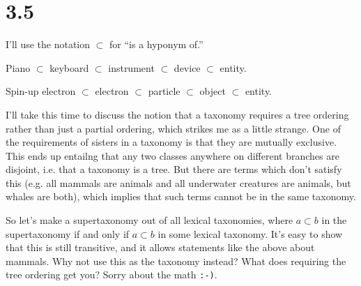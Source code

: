 \documentclass[12pt]{article}
\begin{document}
\section*{3.5}
I'll use the notation $\subset$ for ``is a hyponym of.''

Piano $\subset$ keyboard $\subset$ instrument $\subset$ device $\subset$
entity.

Spin-up electron $\subset$ electron $\subset$ particle $\subset$ object
$\subset$ entity.

I'll take this time to discuss the notion that a taxonomy requires a
tree ordering rather than just a partial ordering, which strikes me as a
little strange.  One of the requirements of sisters in a taxonomy is
that they are mutually exclusive.  This ends up entailng that any two
classes anywhere on different branches are disjoint, i.e. that a
taxonomy is a tree.  But there are terms which don't satisfy this (e.g.
all mammals are animals and all underwater creatures are animals, but
whales are both), which implies that such terms cannot be in the same
taxonomy.

So let's make a supertaxonomy out of all lexical taxonomies, where $a
\subset b$ in the supertaxonomy if and only if $a \subset b$ in some
lexical taxonomy.  It's easy to show that this is still transitive, and
it allows statements like the above about mammals.  Why not use this as
the taxonomy instead?  What does requiring the tree ordering get you?
Sorry about the math \texttt{:-)}.
\end{document}
